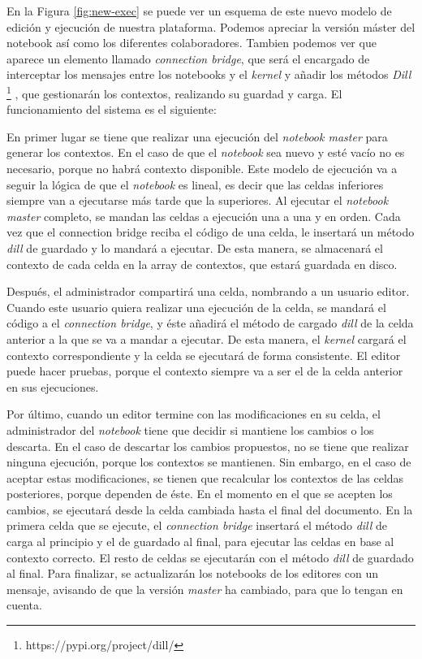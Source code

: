 \documentclass[11pt,spanish,listoffigures]{tfgetsinf}
\begin{document}
En la Figura \ref{fig:new-exec} se puede ver un esquema de este nuevo modelo de edición y ejecución de nuestra plataforma. Podemos apreciar la versión máster del notebook así como los diferentes colaboradores. Tambien podemos ver que aparece un elemento llamado \textit{connection bridge}, que será el encargado de interceptar los mensajes entre los notebooks y el \textit{kernel} y añadir los métodos \textit{Dill} \footnote{https://pypi.org/project/dill/} , que gestionarán los contextos, realizando su guardad y carga. El funcionamiento del sistema es el siguiente:

En primer lugar se tiene que realizar una ejecución del \textit{notebook master} para generar los contextos. En el caso de que el \textit{notebook} sea nuevo y esté vacío no es necesario, porque no habrá contexto disponible. Este modelo de ejecución va a seguir la lógica de que el \textit{notebook} es lineal, es decir que las celdas inferiores siempre van a ejecutarse más tarde que la superiores. Al ejecutar el \textit{notebook master} completo, se mandan las celdas a ejecución una a una y en orden. Cada vez que el connection bridge reciba el código de una celda, le insertará un método \textit{dill} de guardado y lo mandará a ejecutar. De esta manera, se almacenará el contexto de cada celda en la array de contextos, que estará guardada en disco. 

Después, el administrador compartirá una celda, nombrando a un usuario editor. Cuando este usuario quiera realizar una ejecución de la celda, se mandará el código a el \textit{connection bridge}, y éste añadirá el método de cargado \textit{dill} de la celda anterior a la que se va a mandar a ejecutar. De esta manera, el \textit{kernel} cargará el contexto correspondiente y la celda se ejecutará de forma consistente. El editor puede hacer pruebas, porque el contexto siempre va a ser el de la celda anterior en sus ejecuciones.

Por último, cuando un editor termine con las modificaciones en su celda, el administrador del \textit{notebook} tiene que decidir si mantiene los cambios o los descarta. En el caso de descartar los cambios propuestos, no se tiene que realizar ninguna ejecución, porque los contextos se mantienen. Sin embargo, en el caso de aceptar estas modificaciones, se tienen que recalcular los contextos de las celdas posteriores, porque dependen de éste. En el momento en el que se acepten los cambios, se ejecutará desde la celda cambiada hasta el final del documento.  En la primera celda que se ejecute, el \textit{connection bridge} insertará el método \textit{dill} de carga al principio y el de guardado al final, para ejecutar las celdas en base al contexto correcto. El resto de celdas se ejecutarán con el método \textit{dill} de guardado al final. Para finalizar, se actualizarán los notebooks de los editores con un mensaje, avisando de que la versión \textit{master} ha cambiado, para que lo tengan en cuenta.
\end{document}

